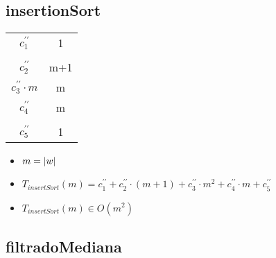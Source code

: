 \documentclass{article}
\begin{document}
    \subsection*{insertionSort}

    \begin{minipage}{0.70\textwidth}
        
    \end{minipage}
    \hfill
    \begin{minipage}{0.25\textwidth}
        \begin{tabular}{|c|c}

            $c^{\prime\prime}_1$ & 1 \\
            $                  $ &   \\
            $c^{\prime\prime}_2$ & m+1 \\
            $c^{\prime\prime}_3 \cdot m$ & m \\
            $c^{\prime\prime}_4$ & m \\
            $                  $ &   \\
            $c^{\prime\prime}_5$ & 1 \\

        \end{tabular}
    \end{minipage}

    \begin{itemize}
        \item $m = |w|$
        \item $T_{insertSort}(m) = c^{\prime\prime}_1 +
                                   c^{\prime\prime}_2 \cdot (m+1) +
                                   c^{\prime\prime}_3 \cdot m^2 +
                                   c^{\prime\prime}_4 \cdot m +
                                   c^{\prime\prime}_5$
        \item $T_{insertSort}(m) \in O(m^{2})$
    \end{itemize}

    \subsection*{filtradoMediana}
\end{document}
